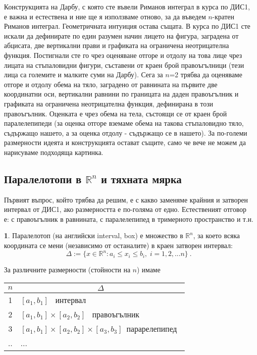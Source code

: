\documentclass[11pt]{article}
\numberwithin{equation}{section}
\numberwithin{figure}{section}
\numberwithin{table}{section}
\theoremstyle{plain}
\theoremstyle{definition}
\newtheorem{defn}[thm]{\protect\definitionname}
\theoremstyle{remark}
\theoremstyle{definition}
\theoremstyle{remark}
\theoremstyle{plain}
\theoremstyle{definition}
\theoremstyle{definition}
\theoremstyle{plain}
\theoremstyle{plain}
\theoremstyle{plain}
\theoremstyle{definition}
\theoremstyle{plain}
\providecommand{\definitionname}{Дефиниция}
\newcommand*{\R}{\mathbb{R}}
\begin{document}
Конструкцията на Дарбу, с която сте въвели Риманов интеграл в курса по ДИС1, е важна и естествена и ние ще я използваме отново, за да въведем $n$-кратен Риманов интеграл. Геометричната интуиция остава същата. В курса по ДИС1 сте искали да дефинирате по един разумен начин лицето на фигура, заградена от абцисата, две вертикални прави и графиката на ограничена неотрицателна функция. Постигнали сте го чрез оценяване отгоре и отдолу на това лице чрез лицата на стъпаловидни фигури, съставени от краен брой правоъгълници (тези лица са големите и малките суми на Дарбу). Сега за $n$=2 трябва да оценяваме отгоре и отдолу обема на тяло, заградено от равнината на първите две координатни оси, вертикални равнини по границата на даден правоъгълник и графиката на ограничена неотрицателна функция, дефинирана в този правоъгълник. Оценката е чрез обема на тела, състоящи се от краен брой паралелепипеди (за оценка отгоре вземаме обема на такова стъпаловидно тяло, съдържащо нашето, а за оценка отдолу - съдържащо се в нашето). За по-големи размерности идеята и конструкцията остават същите, само че вече не можем да нарисуваме подходяща картинка.

\subsection{Паралелотопи в $\R^n$ и тяхната мярка}

Първият въпрос, който трябва да решим, е с какво заменяме крайния и затворен интервал от ДИС1, ако размерността е по-голяма от едно. Естественият отговор е: с правоъгълник в равнината, с паралелепипед в тримерното пространство и т.н.

\begin{defn}
Паралелотоп (на английски interval, box) е множество в $\R^n$, за което всяка координата се мени (независимо от останалите) в краен затворен интервал:
$$\Delta := \{x\in\R^n : a_i \leq x_i \leq b_i,\; i = 1, 2, ... n \} \ .$$
\end{defn}

За различните размерности (стойности на $n$) имаме

\begin{tabular}{ c l }
  $n$ & \multicolumn{1}{c}{$\Delta$}\\
  \hline
  1 & $[a_1, b_1]$ \mbox{ интервал }\\
  2 & $[a_1, b_1]\times[a_2, b_2]$ \mbox{ правоъгълник }\\
  3 & $[a_1, b_1]\times[a_2, b_2]\times[a_3, b_3]$\mbox{ парарелепипед }\\
  ..& ...
\end{tabular}
\end{document}
